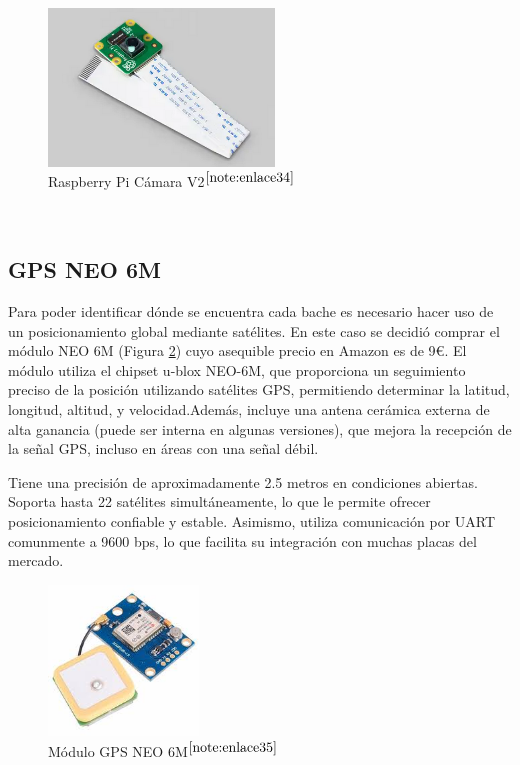 \begin{figure} [h!]
	\begin{center}
		\includegraphics[width=6cm]{figs/campi.png}
	\end{center}
	\caption{Raspberry Pi Cámara V2$^{\ref{note:enlace34}}$} 
\label{fig:raspberrycam}
\end{figure}\

\setcounter{footnote}{34} %

\subsection{GPS NEO 6M}

Para poder identificar dónde se encuentra cada bache es necesario hacer uso de un posicionamiento global mediante satélites. En este caso se decidió comprar el módulo NEO 6M (Figura \ref{fig:gps}) cuyo asequible precio en Amazon es de 9€. El módulo utiliza el chipset u-blox NEO-6M, que proporciona un seguimiento preciso de la posición utilizando satélites \acs{GPS}, permitiendo determinar la latitud, longitud, altitud, y velocidad.Además, incluye una antena cerámica externa de alta ganancia (puede ser interna en algunas versiones), que mejora la recepción de la señal \acs{GPS}, incluso en áreas con una señal débil.

Tiene una precisión de aproximadamente 2.5 metros en condiciones abiertas. Soporta hasta 22 satélites simultáneamente, lo que le permite ofrecer posicionamiento confiable y estable. Asimismo, utiliza comunicación por \ac{UART} comunmente a 9600 bps, lo que facilita su integración con muchas placas del mercado.

\begin{figure} [h!]
	\begin{center}
		\includegraphics[width=4cm]{figs/GPSNEO6MV2.jpeg}
	\end{center}
	\caption{Módulo GPS NEO 6M$^{\ref{note:enlace35}}$} 
\label{fig:gps}
\end{figure}\

